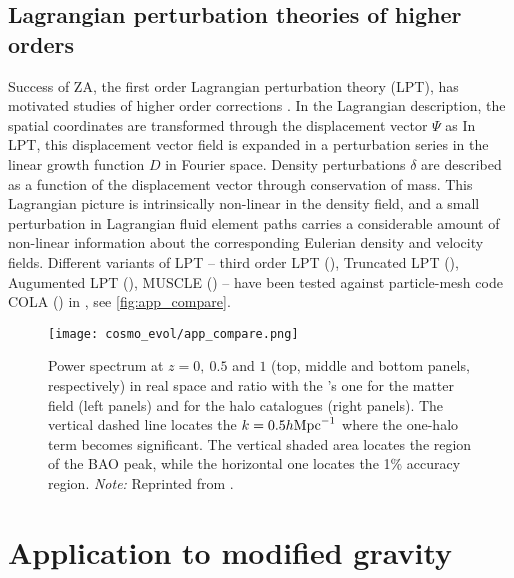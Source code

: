 \subsection{Lagrangian perturbation theories of higher orders}
Success of ZA, the first order Lagrangian perturbation theory (LPT), has motivated studies of higher order corrections \parencite[see e.g.][]{10.1093/mnras/264.2.375,2002PhR...367....1B,2010MNRAS.403.1859J,2014ApJ...788...63S}. In the Lagrangian description, the spatial coordinates are transformed through the displacement vector $\Psi$ as
In LPT, this displacement vector field is expanded in a perturbation series in the linear growth function $D$ in Fourier space. Density perturbations $\delta$ are described as a function of the displacement vector through conservation of mass. This Lagrangian picture is intrinsically non-linear in the density field, and a small perturbation in Lagrangian fluid element paths carries a considerable amount of non-linear information about the corresponding Eulerian density and velocity fields. Different variants of LPT -- third order LPT (\cite{10.1093/mnras/264.2.375}), Truncated LPT (\cite{10.1093/mnras/260.4.765}), Augumented LPT (\cite{10.1093/mnrasl/slt101}), MUSCLE (\cite{10.1093/mnrasl/slv141}) -- have been tested against particle-mesh code COLA (\cite{2013JCAP...06..036T}) in \cite{2017JCAP...07..050M}, see \autoref{fig:app_compare}.

\begin{figure}[ht]
    \centering
    \texttt{[image: cosmo\_evol/app\_compare.png]}
    \caption{Power spectrum at $z = 0,\ 0.5$ and $1$ (top, middle and bottom panels, respectively) in real space and ratio with the \nbody’s one for the matter field (left panels) and for the halo catalogues (right panels). The vertical dashed line locates the $k = 0.5h\text{Mpc}^{-1}$ where the one-halo term becomes significant. The vertical shaded area locates the region of the BAO peak, while the horizontal one locates the 1\% accuracy region.  \textit{Note:} Reprinted from \textcite{2017JCAP...07..050M}.}
    \label{fig:app_compare}
\end{figure}

\section{Application to modified gravity}
